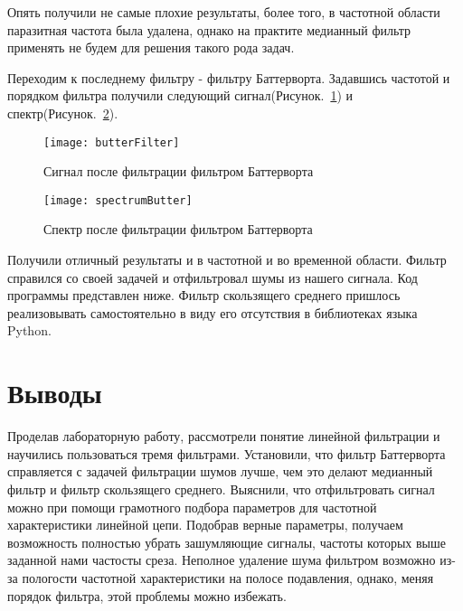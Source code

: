 Опять получили не самые плохие результаты, более того, в частотной области паразитная частота была удалена, однако на практите медианный фильтр применять не будем для решения такого рода задач.

Переходим к последнему фильтру - фильтру Баттерворта. Задавшись частотой и порядком фильтра получили следующий сигнал(Рисунок.~\ref{pic:butterFilter}) и спектр(Рисунок.~\ref{pic:spectrumButter}).

\begin{figure}[H]
	\begin{center}
		\texttt{[image: butterFilter]}
		\caption{Сигнал после фильтрации фильтром Баттерворта} 
		\label{pic:butterFilter} %
	\end{center}
\end{figure}

\begin{figure}[H]
	\begin{center}
		\texttt{[image: spectrumButter]}
		\caption{Спектр после фильтрации  фильтром Баттерворта} 
		\label{pic:spectrumButter} %
	\end{center}
\end{figure}

Получили отличный результаты и в частотной и во временной области. Фильтр справился со своей задачей и отфильтровал шумы из нашего сигнала.
Код программы представлен ниже. Фильтр скользящего среднего пришлось реализовывать самостоятельно в виду его отсутствия в библиотеках языка Python.


\parindent=1cm %

\section{Выводы}
Проделав лабораторную работу, рассмотрели понятие линейной фильтрации и научились пользоваться тремя фильтрами. Установили, что фильтр Баттерворта справляется с задачей фильтрации шумов лучше, чем это делают медианный фильтр и фильтр скользящего среднего. Выяснили, что отфильтровать сигнал можно при помощи грамотного подбора параметров для частотной характеристики линейной цепи. Подобрав верные параметры, получаем возможность полностью убрать зашумляющие сигналы, частоты которых выше заданной нами частосты среза. Неполное удаление шума фильтром возможно из-за пологости частотной характеристики на полосе подавления, однако, меняя порядок фильтра, этой проблемы можно избежать.




